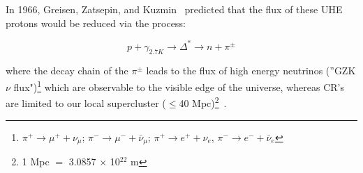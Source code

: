 \par In 1966, Greisen, Zatsepin, and Kuzmin~\cite{Greisen.1966,Zatsepin.1966} predicted that the flux of these UHE protons would be reduced via the process:

\begin{equation}
p + \gamma_{2.7K} \rightarrow \Delta^{*} \rightarrow n + \pi^{\pm}
\label{eq:gzk}
\end{equation}

\noindent where the decay chain of the $\pi^{\pm}$ leads to the flux of high energy neutrinos (''GZK $\nu$ flux")\footnote{$\pi^{+} \rightarrow \mu^{+} + \nu_{\mu}$; $\pi^{-} \rightarrow \mu^{-} + \bar{\nu}_{\mu}$; $\pi^{+} \rightarrow e^{+} + \nu_{e}$, $\pi^{-} \rightarrow e^{-} + \bar{\nu}_{e}$} which are observable to the visible edge of the universe, whereas CR's are limited to our local supercluster ($\leq$40 Mpc)\footnote{1 Mpc $=$ 3.0857 $\times$ 10$^{22}$ m}~\cite{ANITA.2006}.
